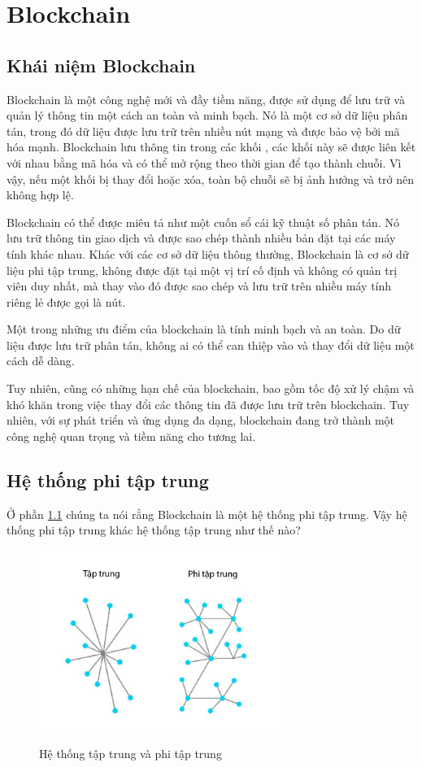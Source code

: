 \section{Blockchain}
\subsection{Khái niệm Blockchain}
\label{subsec:khainiemblockchain}
Blockchain là một công nghệ mới và đầy tiềm năng, được sử dụng để lưu 
trữ và quản lý thông tin một cách an toàn và minh bạch. Nó là một cơ 
sở dữ liệu phân tán, trong đó dữ liệu được lưu trữ trên nhiều nút 
mạng và được bảo vệ bởi mã hóa mạnh. Blockchain lưu thông tin trong các khối , các khối 
này sẽ được liên kết với nhau bằng mã hóa và có thể mở rộng theo 
thời gian để tạo thành chuỗi. Vì vậy, 
nếu một khối bị thay đổi hoặc xóa, toàn bộ chuỗi sẽ bị ảnh 
hưởng và trở nên không hợp lệ.

Blockchain có thể được miêu tả như một cuốn sổ cái kỹ thuật số phân tán. 
Nó lưu trữ thông tin giao dịch và được sao chép thành nhiều bản đặt tại 
các máy tính khác nhau. Khác với các cơ sở dữ liệu thông thường, Blockchain 
là cơ sở dữ liệu phi tập trung, không được đặt tại một vị trí cố định và không có 
quản trị viên duy nhất, mà thay vào đó được sao chép và lưu trữ trên nhiều máy 
tính riêng lẻ được gọi là nút.

Một trong những ưu điểm của blockchain là tính minh bạch và an toàn. 
Do dữ liệu được lưu trữ phân tán, không ai có thể can thiệp vào và 
thay đổi dữ liệu một cách dễ dàng.

Tuy nhiên, cũng có những hạn chế của blockchain, bao gồm tốc độ xử 
lý chậm và khó khăn trong việc thay đổi các thông tin đã được lưu 
trữ trên blockchain. Tuy nhiên, với sự phát triển và ứng dụng đa 
dạng, blockchain đang trở thành một công nghệ quan trọng và tiềm 
năng cho tương lai.
\subsection{Hệ thống phi tập trung}

Ở phần \ref{subsec:khainiemblockchain} chúng ta nói rằng Blockchain là một hệ thống 
phi tập trung. Vậy hệ thống phi tập trung khác hệ thống tập trung
như thế nào?

\begin{figure}[h]
    \centering
    \includegraphics[width=0.7\textwidth]{images/He_thong_tap_chung:phi_tap_chung.png}
    \label{fig:He_thong_tap_chung/phi_tap_chung}
    \caption{Hệ thống tập trung và phi tập trung}
\end{figure}

